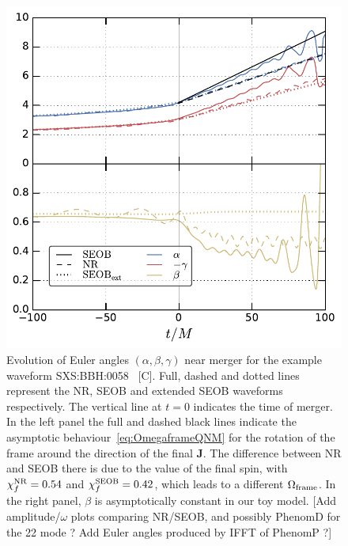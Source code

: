 \documentclass[aps,showpacs,twocolumn,
prd,superscriptaddress,nofootinbib]{revtex4-1}
\newcommand{\SM}[1]{{\color{Red} #1}}
\begin{document}
\begin{figure}
  \centering
  \includegraphics[width=.98\linewidth]{plots/eulerSXS0058_py.pdf}
  \caption{Evolution of Euler angles $(\alpha, \beta, \gamma)$ near merger for the example waveform SXS:BBH:0058~\cite{} \SM{[C]}. Full, dashed and dotted lines represent the NR, SEOB and extended SEOB waveforms respectively. The vertical line at $t=0$ indicates the time of merger. In the left panel the full and dashed black lines indicate the asymptotic behaviour~\eqref{eq:OmegaframeQNM} for the rotation of the frame around the direction of the final $\bm{J}$. The difference between NR and SEOB there is due to the value of the final spin, with $\chi_{f}^{\rm NR} = 0.54$ and $\chi_{f}^{\rm SEOB} = 0.42$, which leads to a different $\Omega_{\rm frame}$. In the right panel, $\beta$ is asymptotically constant in our toy model. \SM{[Add amplitude/$\omega$ plots comparing NR/SEOB, and possibly PhenomD for the 22 mode ? Add Euler angles produced by IFFT of PhenomP ?]}}
  \label{fig:prectoymodel}
\end{figure}

\end{document}

